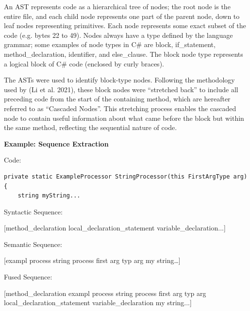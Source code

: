 \documentclass[11pt]{article}
\begin{document}
An AST represents code as a hierarchical tree of nodes; the root node is
the entire file, and each child node represents one part of the parent
node, down to leaf nodes representing primitives. Each node represents
some exact subset of the code (e.g. bytes 22 to 49). Nodes always have a
type defined by the language grammar; some examples of node types in C\#
are block, if\_statement, method\_declaration, identifier, and
else\_clause. The block node type represents a logical block of C\# code
(enclosed by curly braces).

The ASTs were used to identify block-type nodes. Following the methodology
used by (Li et al. 2021), these block nodes were ``stretched back'' to
include all preceding code from the start of the containing method,
which are hereafter referred to as ``Cascaded Nodes''. This stretching process enables the
cascaded node to contain useful information about what came before the
block but within the same method, reflecting the sequential nature of
code.

\begin{framed}
\noindent\textbf{Example: Sequence Extraction}

\vspace{2mm}
\noindent Code:

\begin{lstlisting}[language={[Sharp]C}]
private static ExampleProcessor StringProcessor(this FirstArgType arg)
{
    string myString...
\end{lstlisting}

\vspace{2mm}
\noindent Syntactic Sequence:

\begingroup
\small\ttfamily\raggedright
\noindent
{[}method\_declaration local\_declaration\_statement
variable\_declaration...{]}
\par\endgroup

\vspace{2mm}
\noindent Semantic Sequence:

\begingroup
\small\ttfamily\raggedright
\noindent
{[}exampl process string process first arg typ arg my string\ldots{]}
\par\endgroup

\vspace{2mm}
\noindent Fused Sequence:

\begingroup
\small\ttfamily\raggedright
\noindent
{[}method\_declaration exampl process string process first arg typ arg
local\_declaration\_statement variable\_declaration my string...{]}
\par\endgroup
\end{framed}
\end{document}
